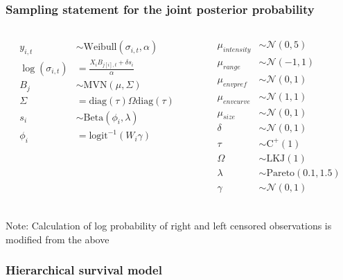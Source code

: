 \documentclass{beamer}
\begin{document}
\begin{frame}
  \frametitle{Sampling statement for the joint posterior probability}
  \begin{columns}
    \begin{column}{0.5\textwidth}
      \begin{align*}
        y_{i, t} &\sim \text{Weibull}(\sigma_{i, t}, \alpha) \\
        \log(\sigma_{i, t}) &= \frac{X_{i}B_{j[i], t} + \delta s_{i}}{\alpha} \\
        B_{j} &\sim \text{MVN}(\mu, \Sigma) \\
        \Sigma &= \text{diag}(\tau) \Omega \text{diag}(\tau) \\
        s_{i} &\sim \text{Beta}(\phi_{i}, \lambda) \\
        \phi_{i} &= \text{logit}^{-1}(W_{i}\gamma) \\
      \end{align*}
    \end{column}
    \begin{column}{0.5\textwidth}
      \begin{align*}
        \mu_{intensity} &\sim \mathcal{N}(0, 5) \\
        \mu_{range} &\sim \mathcal{N}(-1, 1) \\
        \mu_{env pref} &\sim \mathcal{N}(0, 1) \\
        \mu_{env curve} &\sim \mathcal{N}(1, 1) \\
        \mu_{size} &\sim \mathcal{N}(0, 1) \\
        \delta &\sim \mathcal{N}(0, 1) \\
        \tau &\sim \text{C}^{+}(1) \\
        \Omega &\sim \text{LKJ}(1) \\
        \lambda &\sim \text{Pareto}(0.1, 1.5) \\
        \gamma &\sim \mathcal{N}(0, 1) \\
      \end{align*}
    \end{column}
  \end{columns}

  \scriptsize{Note: Calculation of log probability of right and left censored observations is modified from the above}
\end{frame}



\begin{frame}
  \frametitle{Hierarchical survival model}
  \begin{center}
  \end{center}
\end{frame}
\end{document}

